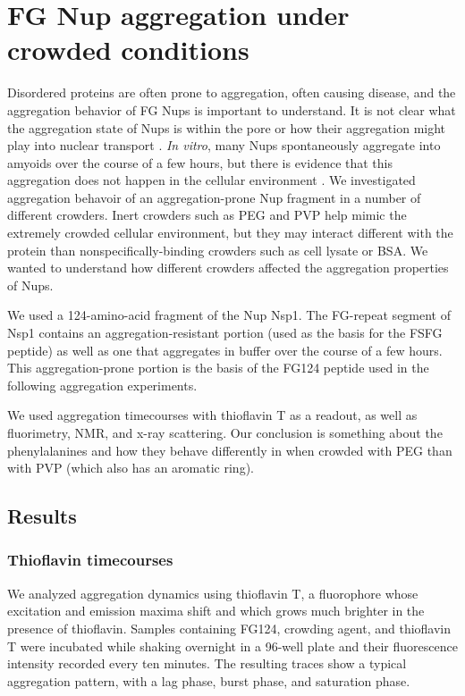 \chapter{FG Nup aggregation under crowded conditions}\label{ch05}

Disordered proteins are often prone to aggregation, often causing disease, and the aggregation behavior of FG Nups is important to understand.  It is not clear what the aggregation state of Nups is within the pore or how their aggregation might play into nuclear transport \cite{things}.  \textit{In vitro}, many Nups spontaneously aggregate into amyoids over the course of a few hours, but there is evidence that this aggregation does not happen in the cellular environment \cite{frey07, Loren's paper}.  We investigated aggregation behavoir of an aggregation-prone Nup fragment in a number of different crowders.  Inert crowders such as PEG and PVP help mimic the extremely crowded cellular environment, but they may interact different with the protein than nonspecifically-binding crowders such as cell lysate or BSA.  We wanted to understand how different crowders affected the aggregation properties of Nups.

We used a 124-amino-acid fragment of the Nup Nsp1.  The FG-repeat segment of Nsp1 contains an aggregation-resistant portion (used as the basis for the FSFG peptide) as well as one that aggregates in buffer over the course of a few hours.  This aggregation-prone portion is the basis of the FG124 peptide used in the following aggregation experiments.

We used aggregation timecourses with thioflavin T as a readout, as well as fluorimetry, NMR, and x-ray scattering.  Our conclusion is something about the phenylalanines and how they behave differently in when crowded with PEG than with PVP (which also has an aromatic ring).


\section{Results}
\subsection{Thioflavin timecourses}

We analyzed aggregation dynamics using thioflavin T, a fluorophore whose excitation and emission maxima shift and which grows much brighter in the presence of thioflavin.  Samples containing FG124, crowding agent, and thioflavin T were incubated while shaking overnight in a 96-well plate and their fluorescence intensity recorded every ten minutes.  The resulting traces show a typical aggregation pattern, with a lag phase, burst phase, and saturation phase.

